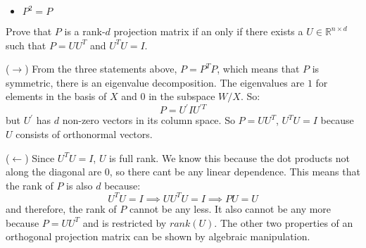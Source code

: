 \documentclass{article}
\begin{document}
\begin{itemize}
\begin{itemize}
                \item $P^{2} = P$
            \end{itemize}
        Prove that $P$ is a rank-$d$ projection matrix if an only if there exists a $U \in \mathbb{R}^{n \times d}$ such that $P = UU^{T}$ and $U^{T}U = I$.
            \begin{answer}
                ($\rightarrow$) From the three statements above, $P = P^{T}P$, which means that $P$ is symmetric, there is an eigenvalue decomposition. The eigenvalues are $1$ for elements in the basis of $X$ and $0$ in the subspace $W / X$. So:
                    \begin{equation*}
                        P = U^{\prime}I U^{\prime T}
                    \end{equation*}
                but $U^{\prime}$ has $d$ non-zero vectors in its column space. So $P = UU^{T}$, $U^{T}U = I$ because $U$ consists of orthonormal vectors.

                ($\leftarrow$) Since $U^{T}U = I$, $U$ is full rank. We know this because the dot products not along the diagonal are $0$, so there cant be any linear dependence. This means that the rank of $P$ is also $d$ because:
                    \begin{equation*}
                        U^{T}U = I \implies UU^{T}U = I \implies PU = U
                    \end{equation*}
                and therefore, the rank of $P$ cannot be any less. It also cannot be any more because $P = UU^{T}$ and is restricted by $rank(U)$. The other two properties of an orthogonal projection matrix can be shown by algebraic manipulation.
            \end{answer}


\end{itemize}
\end{document}
